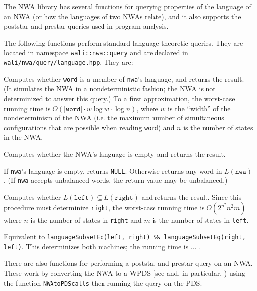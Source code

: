 The NWA library has several functions for querying
properties of the language of an NWA (or how the languages of two NWAs
relate), and it also supports
the poststar and prestar queries used in program analysis.

The following functions perform standard language-theoretic queries. They are
located in namespace \texttt{wali::nwa::query} and are declared in
\texttt{wali/nwa/query/language.hpp}. They are:
\begin{functionlist}
    Computes whether \texttt{word} is a member of
    \texttt{nwa}'s language, and returns the result. (It simulates the
    NWA in a nondeterministic fashion; the NWA is not determinized to answer
    this query.) To a first approximation, the worst-case running time is
    $O(|\texttt{word}|\cdot w\log w\cdot\log n)$, where $w$ is the ``width'' of
    the nondeterminism of the NWA (i.e. the maximum number of
    simultaneous configurations that are possible when reading \texttt{word})
    and $n$ is the number of states in the NWA.

    Computes
    whether the NWA's language is empty, and returns the result.

    If \texttt{nwa}'s language is empty, returns \texttt{NULL}. Otherwise
    returns any word in $L(\texttt{nwa})$. (If \texttt{nwa} accepts
    unbalanced words, the return value may be unbalanced.)

    Computes whether $L(\texttt{left}) \subseteq L(\texttt{right})$
    and returns the result. Since this procedure must determinize \texttt{right},
    the worst-case running time is $O(2^{n^2}n^2m)$ where $n$ is the number of
    states in \texttt{right} and $m$ is the number of states in \texttt{left}.

    Equivalent to \texttt{languageSubsetEq(left, right) \&\&
    languageSubsetEq(right, left)}. This determinizes both machines; the
    running time is ... .
\end{functionlist}

There are also functions for performing a poststar and prestar
query on an NWA. These work by converting the NWA to a WPDS (see
 and, in particular, ) using
the function \texttt{NWAtoPDScalls} then running the query on the PDS.

